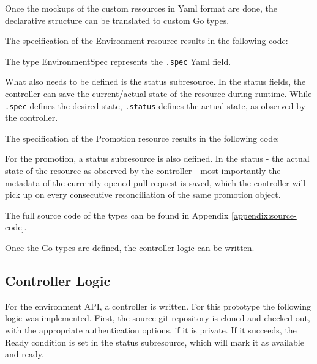 Once the mockups of the custom resources in Yaml format are done,
the declarative structure can be translated to custom Go types.

The specification of the Environment resource results in the following code:




The type EnvironmentSpec represents the \lstinline|.spec| Yaml field.

What also needs to be defined is the status subresource.
In the status fields, the controller can save the current/actual state
of the resource during runtime.
While \lstinline|.spec| defines the desired state,
\lstinline|.status| defines the actual state, as observed by the controller.




The specification of the Promotion resource results in the following code:



For the promotion,
a status subresource is also defined.
In the status - the actual state of the resource as observed by the controller -
most importantly the metadata of the currently opened pull request is saved,
which the controller will pick up on every consecutive reconciliation
of the same promotion object.



The full source code of the types can be found in Appendix
\ref{appendix:source-code}.

Once the Go types are defined,
the controller logic can be written.

\subsection{Controller Logic}

For the environment API,
a controller is written.
For this prototype the following logic was implemented.
First, the source git repository is cloned and checked out,
with the appropriate authentication options, if it is private.
If it succeeds, the Ready condition is set in the status subresource,
which will mark it as available and ready.

